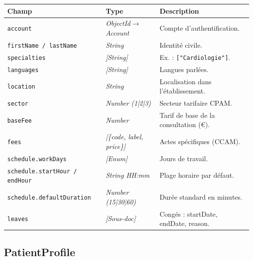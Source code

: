 \documentclass[12pt,a4paper]{report}
\newcommand{\field}[1]{\texttt{\small\textcolor{MedTealDark}{#1}}}
\newcommand{\typ}[1]{\textit{\small\textcolor{CommentGray}{#1}}}
\begin{document}
\begin{center}
\small
\begin{tabularx}{\textwidth}{@{} l l X @{}}
  \toprule
  \textbf{Champ} & \textbf{Type} & \textbf{Description} \\
  \midrule
  \field{account}             & \typ{ObjectId$\to$Account}    & Compte d'authentification. \\
  \field{firstName / lastName}& \typ{String}                  & Identité civile. \\
  \field{specialties}         & \typ{[String]}                & Ex. : \texttt{["Cardiologie"]}. \\
  \field{languages}           & \typ{[String]}                & Langues parlées. \\
  \field{location}            & \typ{String}                  & Localisation dans l'établissement. \\
  \field{sector}              & \typ{Number (1|2|3)}          & Secteur tarifaire CPAM. \\
  \field{baseFee}             & \typ{Number}                  & Tarif de base de la consultation (€). \\
  \field{fees}                & \typ{[\{code, label, price\}]}& Actes spécifiques (CCAM). \\
  \field{schedule.workDays}   & \typ{[Enum]}                  & Jours de travail. \\
  \field{schedule.startHour / endHour} & \typ{String HH:mm}  & Plage horaire par défaut. \\
  \field{schedule.defaultDuration}& \typ{Number (15|30|60)}   & Durée standard en minutes. \\
  \field{leaves}              & \typ{[Sous-doc]}              & Congés : startDate, endDate, reason. \\
  \bottomrule
\end{tabularx}
\end{center}

\subsection{PatientProfile}
\end{document}
